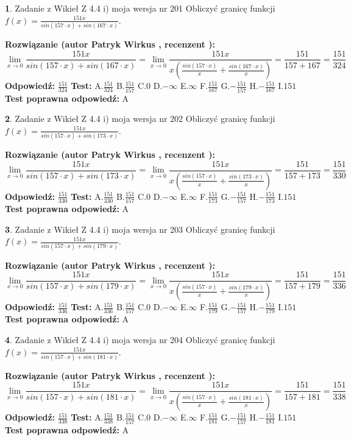 \documentclass[12pt, a4paper]{article}
\theoremstyle{definition} %
\newtheorem{zad}{}
\newcommand{\zadStart}[1]{\begin{zad}#1\newline}
\newcommand{\zadStop}{\end{zad}}
\newcommand{\rozwStart}[2]{\noindent \textbf{Rozwiązanie (autor #1 , recenzent #2): }\newline}
\newcommand{\rozwStop}{\newline}
\newcommand{\odpStart}{\noindent \textbf{Odpowiedź:}\newline}
\newcommand{\odpStop}{\newline}
\newcommand{\testStart}{\noindent \textbf{Test:}\newline}
\newcommand{\testStop}{\newline}
\newcommand{\kluczStart}{\noindent \textbf{Test poprawna odpowiedź:}\newline}
\newcommand{\kluczStop}{\newline}
\begin{document}
\zadStart{Zadanie z Wikieł Z 4.4 i) moja wersja nr 201}
Obliczyć granicę funkcji $f(x)=\frac{151x}{sin(157\cdot x) +sin(167\cdot x)}$.
\zadStop
\rozwStart{Patryk Wirkus}{}
$$\lim\limits_{x\to 0}\frac{151x}{sin(157\cdot x) +sin(167\cdot x)}=\lim\limits_{x\to 0}\frac{151x}{x(\frac{sin(157\cdot x)}{x}+\frac{sin(167\cdot x)}{x})}=\frac{151}{157+167} = \frac{151}{324}$$
\rozwStop
\odpStart
$\frac{151}{324}$
\odpStop
\testStart
A.$\frac{151}{324}$
B.$\frac{151}{157}$
C.$0$
D.$-\infty$
E.$\infty$
F.$\frac{151}{167}$
G.$-\frac{151}{157}$
H.$-\frac{151}{167}$
I.$151$
\testStop
\kluczStart
A
\kluczStop



\zadStart{Zadanie z Wikieł Z 4.4 i) moja wersja nr 202}
Obliczyć granicę funkcji $f(x)=\frac{151x}{sin(157\cdot x) +sin(173\cdot x)}$.
\zadStop
\rozwStart{Patryk Wirkus}{}
$$\lim\limits_{x\to 0}\frac{151x}{sin(157\cdot x) +sin(173\cdot x)}=\lim\limits_{x\to 0}\frac{151x}{x(\frac{sin(157\cdot x)}{x}+\frac{sin(173\cdot x)}{x})}=\frac{151}{157+173} = \frac{151}{330}$$
\rozwStop
\odpStart
$\frac{151}{330}$
\odpStop
\testStart
A.$\frac{151}{330}$
B.$\frac{151}{157}$
C.$0$
D.$-\infty$
E.$\infty$
F.$\frac{151}{173}$
G.$-\frac{151}{157}$
H.$-\frac{151}{173}$
I.$151$
\testStop
\kluczStart
A
\kluczStop



\zadStart{Zadanie z Wikieł Z 4.4 i) moja wersja nr 203}
Obliczyć granicę funkcji $f(x)=\frac{151x}{sin(157\cdot x) +sin(179\cdot x)}$.
\zadStop
\rozwStart{Patryk Wirkus}{}
$$\lim\limits_{x\to 0}\frac{151x}{sin(157\cdot x) +sin(179\cdot x)}=\lim\limits_{x\to 0}\frac{151x}{x(\frac{sin(157\cdot x)}{x}+\frac{sin(179\cdot x)}{x})}=\frac{151}{157+179} = \frac{151}{336}$$
\rozwStop
\odpStart
$\frac{151}{336}$
\odpStop
\testStart
A.$\frac{151}{336}$
B.$\frac{151}{157}$
C.$0$
D.$-\infty$
E.$\infty$
F.$\frac{151}{179}$
G.$-\frac{151}{157}$
H.$-\frac{151}{179}$
I.$151$
\testStop
\kluczStart
A
\kluczStop



\zadStart{Zadanie z Wikieł Z 4.4 i) moja wersja nr 204}
Obliczyć granicę funkcji $f(x)=\frac{151x}{sin(157\cdot x) +sin(181\cdot x)}$.
\zadStop
\rozwStart{Patryk Wirkus}{}
$$\lim\limits_{x\to 0}\frac{151x}{sin(157\cdot x) +sin(181\cdot x)}=\lim\limits_{x\to 0}\frac{151x}{x(\frac{sin(157\cdot x)}{x}+\frac{sin(181\cdot x)}{x})}=\frac{151}{157+181} = \frac{151}{338}$$
\rozwStop
\odpStart
$\frac{151}{338}$
\odpStop
\testStart
A.$\frac{151}{338}$
B.$\frac{151}{157}$
C.$0$
D.$-\infty$
E.$\infty$
F.$\frac{151}{181}$
G.$-\frac{151}{157}$
H.$-\frac{151}{181}$
I.$151$
\testStop
\kluczStart
A
\kluczStop
\end{document}
